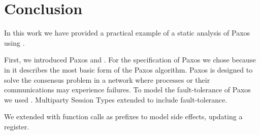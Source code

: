 \chapter{Conclusion}
In this work we have provided a practical example of a static analysis of Paxos using \FTMPST.


First, we introduced Paxos and \FTMPST.
For the specification of Paxos we chose \cite{Lamport01} because in it \citeauthor{Lamport01} describes the most basic form of the Paxos algorithm.
Paxos is designed to solve the consensus problem in a network where processes or their communications may experience failures.
To model the fault-tolerance of Paxos we used \FTMPST.
Multiparty Session Types extended to include fault-tolerance.

We extended \FTMPST with function calls as prefixes to model side effects, \eg updating a register.



